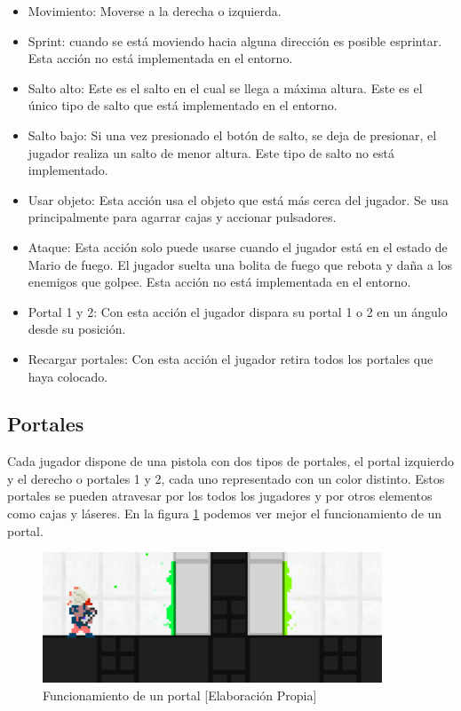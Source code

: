 \begin{itemize}
    \item Movimiento: Moverse a la derecha o izquierda.
    \item Sprint: cuando se está moviendo hacia alguna dirección es posible esprintar. Esta acción no está implementada en el entorno.
    \item Salto alto: Este es el salto en el cual se llega a máxima altura. Este es el único tipo de salto que está implementado en el entorno.
    \item Salto bajo: Si una vez presionado el botón de salto, se deja de presionar, el jugador realiza un salto de menor altura. Este tipo de salto no está implementado.
    \item Usar objeto: Esta acción usa el objeto que está más cerca del jugador. Se usa principalmente para agarrar cajas y accionar pulsadores.
    \item Ataque: Esta acción solo puede usarse cuando el jugador está en el estado de Mario de fuego. El jugador suelta una bolita de fuego que rebota y daña a los enemigos que golpee. Esta acción no está implementada en el entorno.
    \item Portal 1 y 2: Con esta acción el jugador dispara su portal 1 o 2 en un ángulo desde su posición.
    \item Recargar portales: Con esta acción el jugador retira todos los portales que haya colocado.
\end{itemize}

\subsection*{Portales}

Cada jugador dispone de una pistola con dos tipos de portales, el portal izquierdo y el derecho o portales 1 y 2, cada uno representado con un color distinto. Estos portales se pueden atravesar por los todos los jugadores y por otros elementos como cajas y láseres. En la figura \ref {fig:portal} podemos ver mejor el funcionamiento de un portal.

\begin{figure}[h]
    \centering
    \includegraphics[width=0.9\textwidth]{img/portal-function.png}
    \caption{Funcionamiento de un portal [Elaboración Propia]}
    \label{fig:portal}
\end{figure}

